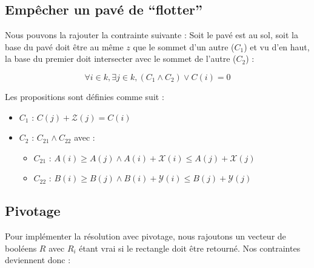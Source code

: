 \documentclass[a4paper]{article}
\begin{document}
\subsection{Empêcher un pavé de ``flotter''}
Nous pouvons la rajouter la contrainte suivante : Soit le pavé est au sol, soit la base du pavé doit être au même $z$ que le sommet d'un autre ($C_1$) et vu d'en haut, la base du premier doit intersecter avec le sommet de l'autre ($C_2$) :

$$\forall i \in k, \exists j \in k, (C_1 \land C_2) \lor C(i) = 0$$

Les propositions sont définies comme suit :
\begin{itemize}
  \item $C_1$ :
  $
  C(j) + \mathcal{Z}(j) = C(i)
  $
  \item $C_2$ : $C_{21} \land C_{22}$ avec :
  \begin{itemize}
    \item $C_{21}$ : $A(i) \geq A(j) \land A(i) + \mathcal{X}(i) \leq A(j) + \mathcal{X}(j)$
    \item $C_{22}$ : $B(i) \geq B(j) \land B(i) + \mathcal{Y}(i) \leq B(j) + \mathcal{Y}(j)$
  \end{itemize}
\end{itemize}

\subsection{Pivotage}

Pour implémenter la résolution avec pivotage, nous rajoutons un vecteur de booléens $R$ avec $R_i$ étant vrai si le rectangle doit être retourné. Nos contraintes deviennent donc :
\end{document}
